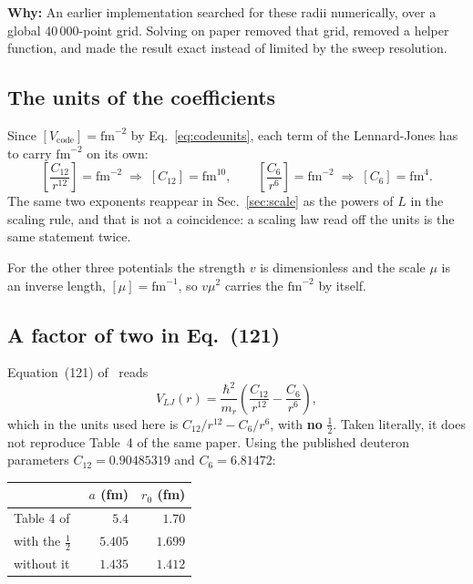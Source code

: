 \documentclass[11pt,a4paper]{article}
\newcommand{\why}[1]{\medskip\noindent\textbf{Why:} #1\medskip}
\begin{document}
\why{An earlier implementation searched for these radii numerically, over a global
40\,000-point grid. Solving on paper removed that grid, removed a helper
function, and made the result exact instead of limited by the sweep resolution.}

\subsection{The units of the coefficients}

Since $[V_{\mathrm{code}}] = \mathrm{fm}^{-2}$ by Eq.~\eqref{eq:codeunits}, each
term of the Lennard-Jones has to carry $\mathrm{fm}^{-2}$ on its own:
\[
  \left[\frac{C_{12}}{r^{12}}\right] = \mathrm{fm}^{-2}
  \;\Longrightarrow\; [C_{12}] = \mathrm{fm}^{10},
  \qquad
  \left[\frac{C_6}{r^{6}}\right] = \mathrm{fm}^{-2}
  \;\Longrightarrow\; [C_6] = \mathrm{fm}^{4}.
\]
The same two exponents reappear in Sec.~\ref{sec:scale} as the powers of $L$ in
the scaling rule, and that is not a coincidence: a scaling law read off the
units is the same statement twice.

For the other three potentials the strength $v$ is dimensionless and the scale
$\mu$ is an inverse length, $[\mu] = \mathrm{fm}^{-1}$, so $v\mu^2$ carries the
$\mathrm{fm}^{-2}$ by itself.

\subsection{A factor of two in Eq.~(121)}
\label{sec:halffactor}

Equation~(121) of~\cite{rbef} reads
\[ V_{LJ}(r) = \frac{\hbar^2}{m_r}\left(\frac{C_{12}}{r^{12}} - \frac{C_6}{r^6}\right), \]
which in the units used here is $C_{12}/r^{12}-C_6/r^6$, with \textbf{no}
$\tfrac12$. Taken literally, it does not reproduce Table~4 of the same paper.
Using the published deuteron parameters $C_{12} = 0.90485319$ and
$C_6 = 6.81472$:

\begin{center}
\begin{tabular}{lrr}
\toprule
& $a$ (fm) & $r_0$ (fm) \\
\midrule
Table 4 of~\cite{rbef} & $5.4$ & $1.70$ \\
with the $\tfrac12$ & $5.405$ & $1.699$ \\
without it & $\mathbf{1.435}$ & $1.412$ \\
\bottomrule
\end{tabular}
\end{center}
\end{document}
